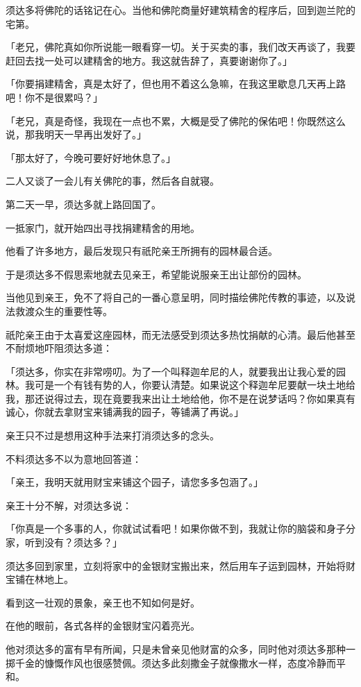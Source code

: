 \documentclass[twoside,openany]{book}
\begin{document}
须达多将佛陀的话铭记在心。当他和佛陀商量好建筑精舍的程序后，回到迦兰陀的宅第。

「老兄，佛陀真如你所说能一眼看穿一切。关于买卖的事，我们改天再谈了，我要赶回去找一处可以建精舍的地方。我这就告辞了，真要谢谢你了。」

「你要捐建精舍，真是太好了，但也用不着这么急嘛，在我这里歇息几天再上路吧！你不是很累吗？」

「老兄，真是奇怪，我现在一点也不累，大概是受了佛陀的保佑吧！你既然这么说，那我明天一早再出发好了。」

「那太好了，今晚可要好好地休息了。」

二人又谈了一会儿有关佛陀的事，然后各自就寝。

第二天一早，须达多就上路回国了。

一抵家门，就开始四出寻找捐建精舍的用地。

他看了许多地方，最后发现只有祇陀亲王所拥有的园林最合适。

于是须达多不假思索地就去见亲王，希望能说服亲王出让部份的园林。

当他见到亲王，免不了将自己的一番心意呈明，同时描绘佛陀传教的事迹，以及说法救渡众生的重要性等。

祇陀亲王由于太喜爱这座园林，而无法感受到须达多热忱捐献的心清。最后他甚至不耐烦地吓阻须达多道：

「须达多，你实在非常唠叨。为了一个叫释迦牟尼的人，就要我出让我心爱的园林。我可是一个有钱有势的人，你要认清楚。如果说这个释迦牟尼要献一块土地给我，那还说得过去，现在竟要我来出让土地给他，你不是在说梦话吗？你如果真有诚心，你就去拿财宝来铺满我的园子，等铺满了再说。」

亲王只不过是想用这种手法来打消须达多的念头。

不料须达多不以为意地回答道：

「亲王，我明天就用财宝来铺这个园子，请您多多包涵了。」

亲王十分不解，对须达多说：

「你真是一个多事的人，你就试试看吧！如果你做不到，我就让你的脑袋和身子分家，听到没有？须达多？」

须达多回到家里，立刻将家中的金银财宝搬出来，然后用车子运到园林，开始将财宝铺在林地上。

看到这一壮观的景象，亲王也不知如何是好。

在他的眼前，各式各样的金银财宝闪着亮光。

他对须达多的富有早有所闻，只是未曾亲见他财富的众多，同时他对须达多那种一掷千金的慷慨作风也很感赞佩。须达多此刻撒金子就像撒水一样，态度冷静而平和。
\end{document}
